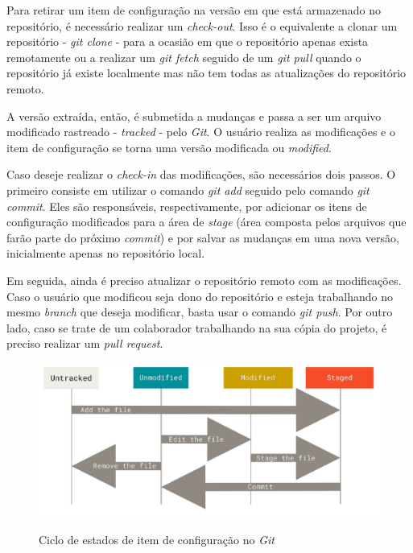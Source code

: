 \par Para retirar um item de configuração na versão em que está armazenado no repositório, é necessário realizar um \textit{check-out}. Isso é o equivalente a clonar um repositório - \textit{git clone} - para a ocasião em que o repositório apenas exista remotamente ou a realizar um \textit{git fetch} seguido de um \textit{git pull} quando o repositório já existe localmente mas não tem todas as atualizações do repositório remoto.
\par A versão extraída, então, é submetida a mudanças e passa a ser um arquivo modificado rastreado - \textit{tracked} - pelo \textit{Git}. O usuário realiza as modificações e o item de configuração se torna uma versão modificada ou \textit{modified}.
\par Caso deseje realizar o \textit{check-in} das modificações, são necessários dois passos. O primeiro consiste em utilizar o comando \textit{git add} seguido pelo comando \textit{git commit}. Eles são responsáveis, respectivamente, por adicionar os itens de configuração modificados para a área de \textit{stage} (área composta pelos arquivos que farão parte do próximo \textit{commit}) e por salvar as mudanças em uma nova versão, inicialmente apenas no repositório local.
\par Em seguida, ainda é preciso atualizar o repositório remoto com as modificações. Caso o usuário que modificou seja dono do repositório e esteja trabalhando no mesmo \textit{branch} que deseja modificar, basta usar o comando \textit{git push}. Por outro lado, caso se trate de um colaborador trabalhando na sua cópia do projeto, é preciso realizar um \textit{pull request}.

\begin{figure}[H]
    \caption{Ciclo de estados de item de configuração no \textit{Git}}
    \vspace{0.5cm}
    \centering
    \includegraphics[width=15cm]{imagens/ciclo_estados.png}
    \label{figura:ciclo_estados}
\end{figure}

